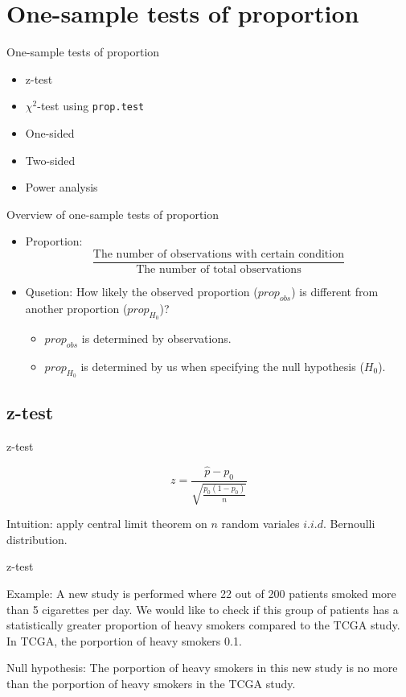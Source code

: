 \documentclass[12pt, t, xcolor=dvipsnames]{beamer}
\newcommand{\code}[1]{\colorbox{codegray}{\textcolor{black!95}{\texttt{#1}}}}
\begin{document}
\section{One-sample tests of proportion}

\begin{frame}{One-sample tests of proportion}
\begin{itemize}
  \item z-test
  \item $\chi^2$-test using \code{prop.test}
  \item One-sided
  \item Two-sided
  \item Power analysis
  
\end{itemize}

\end{frame}

\begin{frame}{Overview of one-sample tests of proportion}
\begin{itemize}
  \item Proportion: $$\frac{\text{The number of observations with certain condition}}{\text{The number of total observations}}$$
  \item Qusetion: How likely the observed proportion ($prop_{obs}$) is different from another proportion ($prop_{H_0}$)?
  \begin{itemize}
    \item $prop_{obs}$ is determined by observations.
    \item $prop_{H_0}$ is determined by us when specifying the null hypothesis ($H_0$).
  \end{itemize}
  
\end{itemize}
\end{frame}


\subsection{z-test}

\begin{frame}[fragile]{z-test}

$$z = \frac{\hat{p} -p_0}{\sqrt{\frac{p_0 (1- p_0)}{n}}}$$

Intuition: apply central limit theorem on $n$ random variales $i.i.d.$ Bernoulli distribution.
\end{frame}

\begin{frame}[fragile]{z-test}

Example: A new study is performed where 22 out of 200 patients smoked more than 5 cigarettes per day. We would like to check if this group of patients has a statistically greater proportion of heavy smokers compared to the TCGA study. In TCGA, the porportion of heavy smokers 0.1. 

Null hypothesis: The porportion of heavy smokers in this new study is no more than the porportion of heavy smokers in the TCGA study. 

\end{frame}
\end{document}
